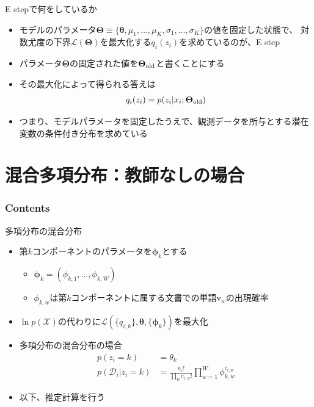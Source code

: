 \documentclass[aspectratio=169,unicode,dvipdfmx,14pt]{beamer}
\begin{document}
\begin{frame}{E stepで何をしているか}
\begin{itemize}
\item モデルのパラメータ$\bm{\Theta} \equiv \{ \bm{\theta}, \mu_1, \ldots, \mu_K, \sigma_1, \ldots, \sigma_K \}$の値を固定した状態で、
対数尤度の下界$\mathcal{L}(\bm{\Theta})$を最大化する$q_i(z_i)$を求めているのが、E step
\item パラメータ$\bm{\Theta}$の固定された値を$\bm{\Theta}_{\mbox{\scriptsize old}}$と書くことにする
\item その最大化によって得られる答えは
\begin{align}
q_i(z_i) = p(z_i|x_i; \bm{\Theta}_{\mbox{\scriptsize old}})
\end{align}
\item つまり、モデルパラメータを固定したうえで、観測データを所与とする潜在変数の条件付き分布を求めている
\end{itemize}
\end{frame}


\section{混合多項分布：教師なしの場合}

\begin{frame}\frametitle{Contents}
\Large \tableofcontents[currentsection]
\end{frame}


\begin{frame}{多項分布の混合分布}
\begin{itemize}
\item 第$k$コンポーネントのパラメータを$\bm{\phi}_k$とする
\begin{itemize}
\item $\bm{\phi}_k = (\phi_{k,1},\ldots,\phi_{k,W})$
\item $\phi_{k,w}$は第$k$コンポーネントに属する文書での単語$\mbox{v}_w$の出現確率
\end{itemize}
\item $\ln p(\mathcal{X})$の代わりに$\mathcal{L}(\{q_{i,k}\},\bm{\theta}, \{ \bm{\phi}_k \})$を最大化
\item 多項分布の混合分布の場合
\begin{align}
p(z_i=k) & = \theta_k \\
p(\mathcal{D}_i | z_i=k) & = \frac{n_i!}{\prod_w c_{i,w}!} \prod_{w=1}^W \phi_{k,w}^{c_{i,w}}
\end{align}
\item 以下、推定計算を行う
\end{itemize}
\end{frame}
\end{document}
